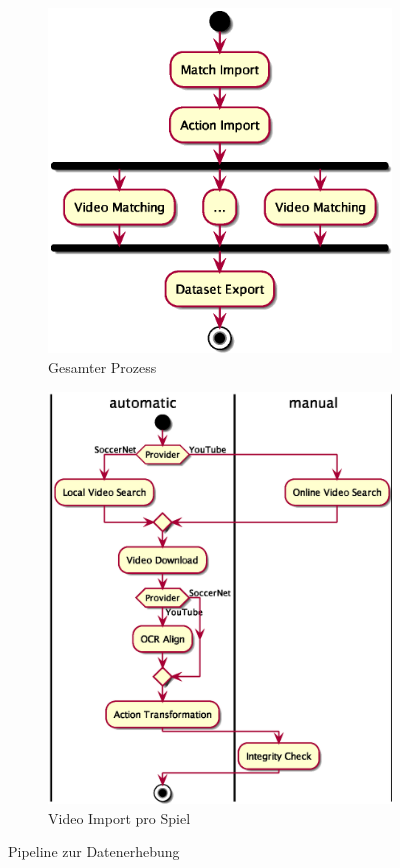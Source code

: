 \begin{figure}
    \centering
    \begin{subfigure}{.5\textwidth}
        \centering
        \includegraphics[width=.8\linewidth]{fig/collection.eps}
        \caption{Gesamter Prozess}
        \label{fig:collection-pipeline_a}
    \end{subfigure}%
    \begin{subfigure}{.5\textwidth}
        \centering
        \includegraphics[width=.95\linewidth]{fig/collection-pipeline.eps}
        \caption{Video Import pro Spiel}
        \label{fig:collection-pipeline_b}
    \end{subfigure}
    \caption{Pipeline zur Datenerhebung}
    \label{fig:collection-pipeline}
\end{figure}


